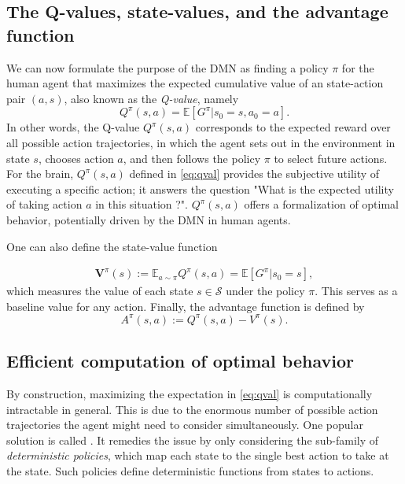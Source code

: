 \documentclass[10pt,letterpaper]{article}
\def\V{\mathbf{V}}
\begin{document}
\subsection{The Q-values, state-values, and the advantage function}
We can now formulate the purpose of the DMN
as finding a policy $\pi$ for the human agent that maximizes the
expected cumulative value of an state-action pair $(a,s)$, also known as the \textit{Q-value}, namely
\begin{equation}
  \label{eq:qval}
  Q^{\pi}(s,a) = \mathbb E [G^\pi|s_0=s,a_0=a].
\end{equation}
In other words,
the Q-value $Q^{\pi}(s,a)$ corresponds to the expected reward
over all possible action trajectories, in which
the agent sets out in the environment in state
$s$, chooses action $a$,
and then follows the policy $\pi$ to select future actions.
For the brain,
$Q^{\pi}(s, a)$ defined in \eqref{eq:qval} provides the subjective
utility of executing a specific action; it answers the question
"What is the expected utility of taking action $a$ in this situation ?".
$Q^{\pi}(s,a)$ offers a formalization of optimal behavior,
potentially driven by the DMN in human agents.

One can also define the state-value function

\begin{eqnarray}
  \V^\pi(s) := \mathbb E_{a \sim \pi}Q^\pi(s,a) = \mathbb E [G^\pi|s_0=s],
\end{eqnarray}
which measures the value of each state $s \in \mathcal S$ under the policy $\pi$. This serves
as a baseline value for any action. Finally, the advantage function is defined by
\begin{equation}
A^\pi(s,a) :=  Q^\pi(s,a) - V^\pi(s).
\end{equation}


\subsection{Efficient computation of optimal behavior}
By construction, maximizing the expectation in  \eqref{eq:qval} is computationally intractable in general.
This is due to the enormous number of possible action
trajectories the agent might need to
consider simultaneously.
One popular solution is called . It remedies
the issue by only considering the sub-family of
\textit{deterministic policies}, which map each state to the single best action to
take at the state. Such policies define deterministic functions from states to actions.
\end{document}
